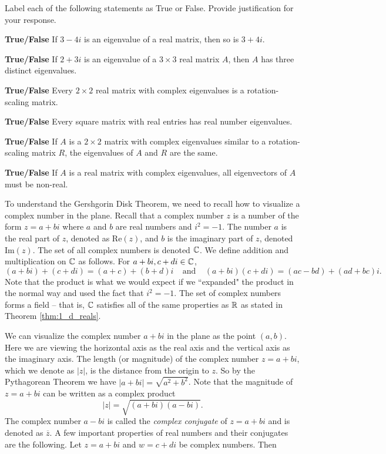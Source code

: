 \ea


\item Label each of the following statements as True or False. Provide justification for your response.
\ba
\item \textbf{True/False} If $3-4i$ is an eigenvalue of a real matrix, then so is $3+4i$.

\item \textbf{True/False} If $2+3i$ is an eigenvalue of a $3\times 3$ real matrix $A$, then $A$ has three distinct eigenvalues.

\item \textbf{True/False} Every $2\times 2$ real matrix with complex eigenvalues is a rotation-scaling matrix.

\item \textbf{True/False} Every square matrix with real entries has real number eigenvalues. 

\item \textbf{True/False} If $A$ is a $2\times 2$ matrix with complex eigenvalues similar to a rotation-scaling matrix $R$, the eigenvalues of $A$ and $R$ are the same.

\item \textbf{True/False} If $A$ is a real matrix with complex eigenvalues, all eigenvectors of $A$ must be non-real.


\ea

\ee

\label{sec:proj_gershgorin}

To understand the Gershgorin Disk Theorem, we need to recall how to visualize a complex number in the plane. Recall that a complex number $z$ is a number of the form $z = a+bi$ where $a$ and $b$ are real numbers and $i^2 = -1$. The number $a$ is the real part of $z$, denoted as $\text{Re}(z)$, and $b$ is the imaginary part of $z$, denoted $\text{Im}(z)$. The set of all complex numbers is denoted $\mathbb{C}$. We define addition and multiplication on $\mathbb{C}$ as follows. For $a+bi, c+di \in \mathbb{C}$, 
\[(a+bi) + (c+di) = (a+c) + (b+d)i \ \ \ \ \ \text{and} \ \ \ \ \ (a+bi)(c+di) = (ac-bd) + (ad+bc)i.\]
Note that the product is what we would expect if we ``expanded" the product in the normal way and used the fact that $i^2=-1$. The set of complex numbers forms a field -- that is, $\mathbb{C}$ satisfies all of the same properties as $\mathbb{R}$ as stated in Theorem \ref{thm:1_d_reals}. 

We can visualize the complex number $a+bi$ in the plane as the point $(a,b)$. Here we are viewing the horizontal axis as the real axis and the vertical axis as the imaginary axis. The length (or magnitude) of the complex number $z = a+bi$, which we denote as $|z|$, is the distance from the origin to $z$. So by the Pythagorean Theorem we have $|a+bi| = \sqrt{a^2+b^2}$. Note that the magnitude of $z = a+bi$ can be written as a complex product 
\[|z| = \sqrt{(a+bi)(a-bi)}.\]
The complex number $a-bi$ is called the \emph{complex conjugate} of $z=a+bi$ and is denoted as $\overline{z}$. A few important properties of real numbers and their conjugates are the following. Let $z = a+bi$ and $w = c+di$ be complex numbers. Then


